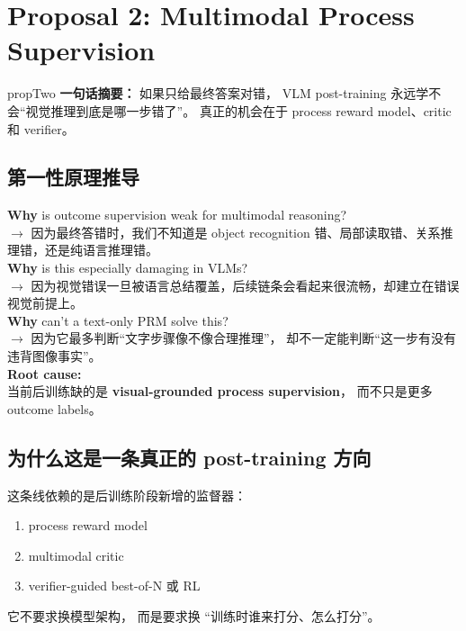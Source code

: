 \documentclass[12pt,a4paper]{article}
\begin{document}
\newpage
\section{Proposal 2: Multimodal Process Supervision}

\begin{proposalbox}{propTwo}
\textbf{一句话摘要：}
如果只给最终答案对错，
VLM post-training 永远学不会``视觉推理到底是哪一步错了''。
真正的机会在于 process reward model、critic 和 verifier。
\end{proposalbox}

\subsection{第一性原理推导}

\begin{whybox}
\textbf{Why} is outcome supervision weak for multimodal reasoning?\\
$\rightarrow$ 因为最终答错时，我们不知道是 object recognition 错、局部读取错、关系推理错，还是纯语言推理错。\\[3pt]
\textbf{Why} is this especially damaging in VLMs?\\
$\rightarrow$ 因为视觉错误一旦被语言总结覆盖，后续链条会看起来很流畅，却建立在错误视觉前提上。\\[3pt]
\textbf{Why} can't a text-only PRM solve this?\\
$\rightarrow$ 因为它最多判断``文字步骤像不像合理推理''，
却不一定能判断``这一步有没有违背图像事实''。\\[3pt]
\textbf{Root cause:}\\
当前后训练缺的是 \textbf{visual-grounded process supervision}，
而不只是更多 outcome labels。
\end{whybox}

\subsection{为什么这是一条真正的 post-training 方向}

这条线依赖的是后训练阶段新增的监督器：
\begin{enumerate}[leftmargin=2em]
  \item process reward model
  \item multimodal critic
  \item verifier-guided best-of-N 或 RL
\end{enumerate}

它不要求换模型架构，
而是要求换 ``训练时谁来打分、怎么打分''。
\end{document}
